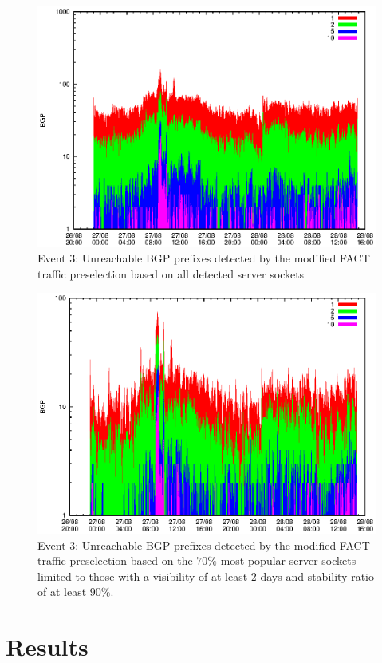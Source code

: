\begin{figure}
	[p] \centering 
	\includegraphics[width=0.75\linewidth]{images/events/2010_08_27/bgp_log_all_external.eps}
	\caption{Event 3: Unreachable BGP prefixes detected by the modified FACT traffic preselection based on all detected server sockets} 
	\label{fig:RIPE_FACT_allSES} 
\end{figure}

\begin{figure}
	[p] \centering 
	\includegraphics[width=0.75\linewidth]{images/events/2010_08_27/bgp_log_Set_var_0_1_stab_9_vts_2.eps}
	\caption{Event 3: Unreachable BGP prefixes detected by the modified FACT traffic preselection based on the $70\%$ most popular server sockets limited to those with a visibility of at least 2 days and stability ratio of at least $90\%$.} 
	\label{fig:RIPE_FACT_popularVTS2STAB9} 
\end{figure}

\newpage
\section{Results}

